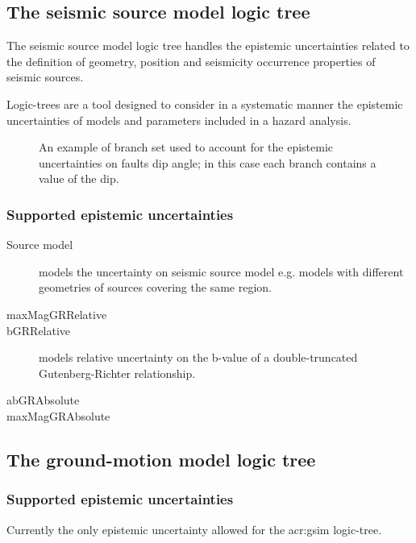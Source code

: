 \subsection{The seismic source model logic tree}
The seismic source model logic tree handles the epistemic uncertainties
related to the definition of geometry, position and seismicity occurrence 
properties of seismic sources. 

Logic-trees are a tool designed to consider in a systematic manner the 
epistemic uncertainties of models and parameters included in a hazard 
analysis.
\begin{figure}[!hb]
%
\caption{An example of branch set used to account for the epistemic 
uncertainties on faults dip angle; in this case each branch contains a value 
of the dip.}
\label{fig:logic_tree_branching_levels}
\end{figure}

%
\subsubsection{Supported epistemic uncertainties}

\begin{description}
\item [Source model] models the uncertainty on seismic source model e.g. models
with different geometries of sources covering the same region.
\item [maxMagGRRelative]
\item [bGRRelative] models relative uncertainty on the b-value of a
double-truncated Gutenberg-Richter relationship.
\item [abGRAbsolute]
\item [maxMagGRAbsolute]
\end{description}
%
\subsection{The ground-motion model logic tree}
%
\subsubsection{Supported epistemic uncertainties}
Currently the only epistemic uncertainty allowed for the \gls{acr:gsim}
logic-tree.
%
